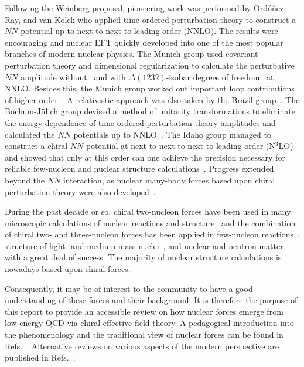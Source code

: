 \documentclass[sort&compress,preprint,3p]{elsarticle}
\begin{document}
Following the Weinberg proposal, pioneering
work was performed by Ord\'o\~nez, Ray, and
van Kolck \cite{ORK94,ORK96} who applied time-ordered perturbation theory to
construct a $NN$ potential up to next-to-next-to-leading order (NNLO).
The results were encouraging and nuclear EFT quickly developed into one of the most popular
branches of modern nuclear physics.
The Munich group used covariant perturbation theory and dimensional regularization
to calculate the perturbative
$NN$ amplitude without~\cite{KBW97} and 
with $\Delta(1232)$-isobar degrees of freedom~\cite{KGW98} at NNLO.
Besides this, the Munich group worked out important loop contributions of
higher order~\cite{Kai00a,Kai00b,Kai01,Kai01a,Kai01b}.
A relativistic approach was also taken by the Brazil group~\cite{RR94,RR03}.
The Bochum-J\"ulich group devised
a method of unitarity transformations to eliminate the energy-dependence of 
time-ordered perturbation theory amplitudes and calculated 
the $NN$ potentials up to NNLO~\cite{EGM98,EGM00}.
The Idaho group managed to construct a chiral $NN$ potential
at next-to-next-to-next-to-leading order (N$^3$LO) and showed that only at
this order can one achieve the precision necessary for reliable few-nucleon
and nuclear structure calculations~\cite{EM02a,EM02,EM03,ME05}.
Progress extended beyond the $NN$ interaction, as nuclear many-body forces based 
upon chiral perturbation theory were also developed~\cite{Wei92,Kol94,Epe02b,IR07,Ber08}.

During the past decade or so,
chiral two-nucleon forces have been used in many microscopic calculations of
nuclear reactions and structure~\cite{DF07,Cor02,Cor05,Cor10,NC04,FNO05,Kow04,DH04,Wlo05,Dea05,Gou06,Hag08,Hag10,FOS04,FOS09} 
and the combination of chiral two- and three-nucleon forces has been applied in
few-nucleon reactions~\cite{Epe02b,Erm05,Kis05,Wit06,Ley06,Ste07,KE07,Mar09,Kie10,Viv10},
structure of light- and medium-mass nuclei~\cite{Nog06,Nav07,Hag07,Ots09},
and nuclear and neutron matter~\cite{Bog05,HS09}---with a great deal of success.
The majority of nuclear structure calculations is nowadays based upon chiral forces.

Consequently, it may be of interest to the community
to have a good understanding of these forces
and their background.
It is therefore the purpose of this report to provide an accessible review 
on how nuclear forces emerge from low-energy QCD via chiral effective field theory.
A pedagogical introduction into the phenomenology and the traditional
view of nuclear forces can be found in Refs.~\cite{Mac89,MS01}.
Alternative reviews on various aspects of the modern perspective are published in Refs.~\cite{Kol99,BK02,Epe06,EHM09}.
\end{document}
